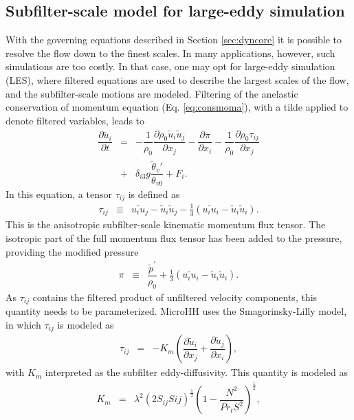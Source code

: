 \documentclass[gmd]{copernicus}
\newcommand{\uf}{\ensuremath{\widetilde{u}}}
\newcommand{\thetaf}{\ensuremath{\widetilde{\theta}}}
\begin{document}
\subsection{Subfilter-scale model for large-eddy simulation}
With the governing equations described in Section \ref{sec:dyncore} it is possible to resolve the flow down to the finest scales. In many applications, however, such simulations are too costly. In that case, one may opt for large-eddy simulation (LES), where filtered equations are used to describe the largest scales of the flow, and the subfilter-scale motions are modeled. Filtering of the anelastic conservation of momentum equation (Eq. \ref{eq:consmoma}), with a tilde applied to denote filtered variables, leads to 
\begin{eqnarray}
\nonumber \dfrac{\partial \uf_i}{\partial t} & = & - \dfrac{1}{\rho_0} \dfrac{\partial \rho_0 \uf_i \uf_j}{\partial x_j} 
- \dfrac{\partial \pi}{\partial x_i} - \dfrac{1}{\rho_0} \dfrac{\partial \rho_0 \tau_{ij}}{\partial x_j}\\
& + & \delta_{i3} g \dfrac{\thetaf_v'}{\theta_{v0}} + F_i.\label{eq:consmoma_filter}
\end{eqnarray}
In this equation, a tensor $\tau_{ij}$ is defined as
\begin{eqnarray}
\tau_{ij}  & \equiv & \widetilde{u_i u_j} - \uf_i \uf_j - \frac{1}{3} \left( \widetilde{u_i u_i} - \uf_i \uf_i \right).
\end{eqnarray}
This is the anisotropic subfilter-scale kinematic momentum flux tensor. The isotropic part of the full momentum flux tensor has been added to the pressure, providing the modified pressure
\begin{eqnarray}
\pi & \equiv & \dfrac{\widetilde{p}^\prime}{\rho_0} + \frac{1}{3} \left( \widetilde{u_i u_i} - \uf_i \uf_i \right).
\end{eqnarray}
As $\tau_{ij}$ contains the filtered product of unfiltered velocity components, this quantity needs to be parameterized. MicroHH uses the Smagorinsky-Lilly \citep{Lilly1968} model, in which $\tau_{ij}$ is modeled as
\begin{eqnarray}
\tau_{ij} & = & -K_m \left( \dfrac{\partial \uf_i}{\partial x_j} + \dfrac{\partial \uf_j}{\partial x_i} \right),
\end{eqnarray}
with $K_m$ interpreted as the subfilter eddy-diffusivity. This quantity is modeled as 
\begin{eqnarray}
K_m    & = & \lambda^2 \left( 2 S_{ij} S{ij} \right)^\frac{1}{2}
\left(1 - \dfrac{N^2}{Pr_t S^2} \right)^\frac{1}{2},
\end{eqnarray}
\end{document}
